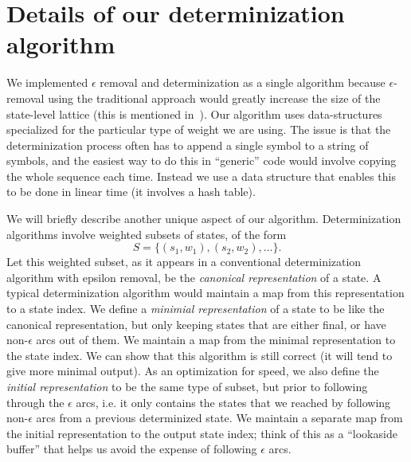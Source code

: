 \documentclass{article}
\begin{document}
\section{Details of our determinization algorithm}
\label{sec:details}

We implemented $\epsilon$ removal and determinization as a single algorithm 
because $\epsilon$-removal using the traditional approach would greatly
increase the size of the state-level lattice (this is mentioned 
in~\cite{efficient_general}).  Our algorithm uses data-structures
specialized for the particular type of weight we are using.  The issue
is that the determinization process often has to append a single symbol to
a string of symbols, and the easiest way to
do this in ``generic'' code would involve copying the whole sequence each time.
Instead we use a data structure that enables this to be done in linear
time (it involves a hash table).  

We will briefly describe another unique aspect of our
algorithm.  Determinization algorithms involve weighted subsets of states,
of the form
\begin{equation}
   S = \{ (s_1, w_1), (s_2, w_2), \ldots \} .
\end{equation}
Let this weighted subset, as it appears in a conventional determinization
algorithm with epsilon removal, be the {\em canonical representation} of a state.
A typical determinization algorithm would maintain a map from this representation
to a state index.  We define a {\em minimial representation} of a state
to be like the canonical representation, but only keeping states that
are either final, or have non-$\epsilon$ arcs out of them.  We maintain
a map from the minimal representation to the state index.  We can
show that this algorithm is still correct (it will tend to give more
minimal output).   As an optimization for speed, we also define
the {\em initial representation} to be the same type of subset, but prior
to following through the $\epsilon$ arcs, i.e. it only contains the states
that we reached by following non-$\epsilon$ arcs from a previous determinized
state.  We maintain a separate map from the initial representation to
the output state index; think of this as a ``lookaside buffer'' that helps us
avoid the expense of following $\epsilon$ arcs. 
\end{document}
